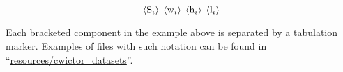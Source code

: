 \begin{equation}
\label{cwictor}
\left \langle \textup{S}_{i} \right \rangle\; \left \langle \textup{w}_{i} \right \rangle\; \left \langle \textup{h}_{i} \right \rangle\; \left \langle \textup{l}_{i} \right \rangle 
\end{equation}

Each bracketed component in the example above is separated by a tabulation marker. Examples of files with such notation can be found in ``\url{resources/cwictor_datasets}''.